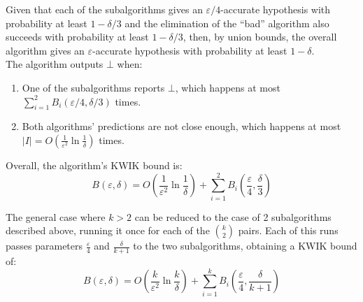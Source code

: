 Given that each of the subalgorithms gives an $\varepsilon/4$-accurate hypothesis
with probability at least $1 - \delta/3$ and the elimination of the ``bad''
algorithm also succeeds with probability at least $1 - \delta/3$, then, by union
bounds, the overall algorithm gives an $\varepsilon$-accurate hypothesis with
probability at least $1 - \delta$. \\

The algorithm outputs $\bot$ when:
\begin{enumerate}
  \item One of the subalgorithms reports $\bot$, which happens at most
  $\sum_{i = 1}^2 B_i(\varepsilon/4, \delta/3)$ times.
  \item Both algorithms' predictions are not close enough, which happens at most
  $|I| = O\left( \frac{1}{\varepsilon^2} \ln \frac{1}{\delta} \right)$ times.
\end{enumerate}
Overall, the algorithm's KWIK bound is:
$$B(\varepsilon, \delta) = O\left( \frac{1}{\varepsilon^2} \ln \frac{1}{\delta}
\right) + \sum_{i = 1}^2 B_i\left(\frac{\varepsilon}{4}, \frac{\delta}{3}\right)$$

The general case where $k > 2$ can be reduced to the case of 2 subalgorithms
described above, running it once for each of the ${k \choose 2}$ pairs. Each
of this runs passes parameters $\frac{\varepsilon}{4}$ and $\frac{\delta}{k+1}$
to the two subalgorithms, obtaining a KWIK bound of:
$$B(\varepsilon, \delta) = O\left( \frac{k}{\varepsilon^2} \ln \frac{k}{\delta}
\right) + \sum_{i=1}^k B_i \left( \frac{\varepsilon}{4}, \frac{\delta}{k + 1}
\right)$$

